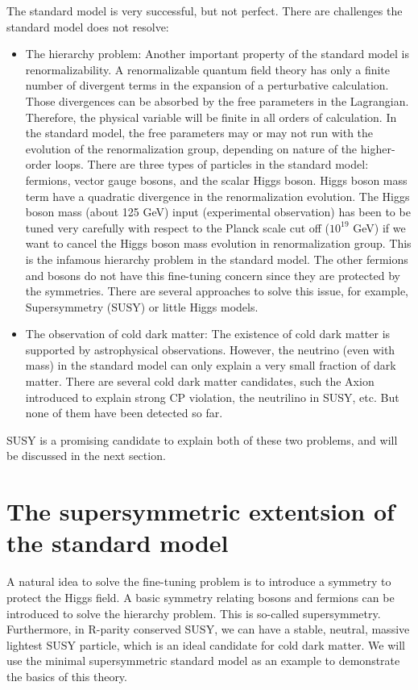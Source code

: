 The standard model is very successful, but not perfect. There are challenges the standard model does not resolve:
\begin{itemize}
\item The hierarchy problem: Another important property of the standard model is renormalizability. A renormalizable quantum field theory has only a finite number of divergent terms in the expansion of a perturbative calculation. Those divergences can be absorbed by the free parameters in the Lagrangian. Therefore, the physical variable will be finite in all orders of calculation. In the standard model, the free parameters may or may not run with the evolution of the renormalization group, depending on nature of the higher-order loops. There are three types of particles in the standard model: fermions, vector gauge bosons, and the scalar Higgs boson. Higgs boson mass term have a quadratic divergence in the renormalization evolution. The Higgs boson mass (about 125 GeV) input (experimental observation) has been to be tuned very carefully with respect to the Planck scale cut off ($10^{19}$ GeV) if we want to cancel the Higgs boson mass evolution in renormalization group. This is the infamous hierarchy problem in the standard model. The other fermions and bosons do not have this fine-tuning concern since they are protected by the symmetries. There are several approaches to solve this issue, for example, Supersymmetry (SUSY) or little Higgs models\cite{Schmaltz:2005ky}. 
\item The observation of cold dark matter: The existence of cold dark matter is supported by astrophysical observations. However, the neutrino (even with mass) in the standard model can only explain a very small fraction of dark matter. There are several cold dark matter candidates, such the Axion introduced to explain strong CP violation, the neutrilino in SUSY, etc. But none of them have been detected so far.
\end{itemize}

SUSY is a promising candidate to explain both of these two problems, and will be discussed in the next section. 

\clearpage
\section{The supersymmetric extentsion of the standard model}
A natural idea to solve the fine-tuning problem is to introduce a symmetry to protect the Higgs field. A basic symmetry relating bosons and fermions can be introduced to solve the hierarchy problem. This is so-called supersymmetry. Furthermore, in R-parity\cite{Martin:1997ns} conserved SUSY, we can have a stable, neutral, massive lightest SUSY particle, which is an ideal candidate for cold dark matter. We will use the minimal supersymmetric standard model as an example to demonstrate the basics of this theory. 

